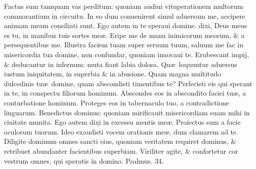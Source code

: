 \documentclass[a5paper,10pt]{book}
\def\ae{æ}
\begin{document}
\begin{multicols*}{2}
\newline \color{red} F\color{black}actus sum tamquam vas perditum: quoniam audiui vituperationem multorum commorantium in circuitu.
\newline \color{red} I\color{black}n eo dum conuenirent simul aduersum me, accipere animam meam consiliati sunt.
\newline \color{red} E\color{black}go autem in te speraui domine. dixi, Deus meus es tu, in manibus tuis sortes me\ae .
\newline \color{red} E\color{black}ripe me de manu inimicorum meorum, \& a persequentibus me.
\newline \color{red} I\color{black}llustra faciem tuam super seruum tuum, saluum me fac in misericordia tua domine, non confundar, quoniam inuocaui te.
\newline \color{red} E\color{black}rubescant impij, \& deducantur in infernum: muta fiant labia dolosa.
\newline \color{red} Q\color{black}u\ae \ loquuntur aduersus iustum iniquitatem, in superbia \& in abusione.
\newline \color{red} Q\color{black}uam magna multitudo dulcedinis tu\ae \ domine, quam abscondisti timentibus te?
\newline \color{red} P\color{black}erfecisti eis qui sperant in te, in conspectu filiorum hominum.
\newline \color{red} A\color{black}bscondes eos in abscondito faciei tu\ae , a conturbatione hominum.
\newline \color{red} P\color{black}roteges eos in tabernaculo tuo, a contradictione linguarum.
\newline \color{red} B\color{black}enedictus dominus: quoniam mirificauit misericordiam suam mihi in ciuitate munita.
\newline \color{red} E\color{black}go autem dixi in excessu mentis me\ae , Proiectus sum a facie oculorum tuorum.
\newline \color{red} I\color{black}deo exaudisti vocem orationis me\ae , dum clamarem ad te.
\newline \color{red} D\color{black}iligite dominum omnes sancti eius, quoniam veritatem requiret dominus, \& retribuet abundanter facientibus superbiam.
\newline \color{red} V\color{black}iriliter agite, \& confortetur cor vestrum omnes, qui speratis in domino.
\newline \color{red} Psalmus. 34. \color{black}
\vspace{-.5em}

\end{multicols*}
\end{document}
